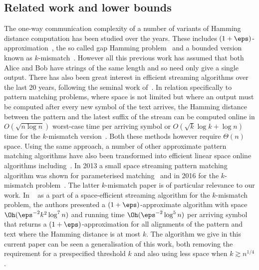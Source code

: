 \subsection{Related work and lower bounds}
The one-way communication complexity of a number of variants of Hamming distance computation has been studied over the years. These includes $(1+\eps)$-approximation~\cite{JW:2013}, the so called gap Hamming problem~\cite{CR:2012} and a bounded version known as $k$-mismatch~\cite{HSZZ:06}. However all this previous work has assumed that both Alice and Bob have strings of the same length and so need only give a single output. There has also been great interest in efficient streaming algorithms over the last 20 years, following the seminal work of~\cite{AMS:1996}. In relation specifically to pattern matching problems,  where space is not limited but where an output must be computed after every new symbol of the text arrives, the Hamming distance between the pattern and the latest suffix of the stream can be computed online in $O(\sqrt{n\log{n}})$ worst-case time per arriving symbol or $O(\sqrt{k}\log{k} + \log{n})$ time for the $k$-mismatch version~\cite{CS:2010}.  Both these methods however require $\Theta(n)$ space.  Using the same approach, a number of other approximate pattern matching algorithms have also been transformed into efficient linear space online algorithms including~\cite{AAKLP:2008,AABLLPSV:2009,AALP:2006,AFM:1994, AEE:2006,ACHP:2003,LV:1988kdiff}. In 2013 a small space streaming pattern matching algorithm was shown for parameterised matching~\cite{JPS:2013} and in 2016 for the $k$-mismatch problem~\cite{CFPSS:2016}. The latter $k$-mismatch paper is of particular relevance to our work. In ~\cite{CFPSS:2016} as a part of a space-efficient streaming algorithm for the $k$-mismatch problem, the authors presented a $(1+\eps)$-approximate algorithm with space $\Oh(\eps^{-2} k^2 \log^7 n)$ and running time $\Oh(\eps^{-2} \log^5 n)$ per arriving symbol that returns a $(1+\eps)$-approximation for all alignments of the pattern and text where the Hamming distance is at most $k$. The algorithm we give in this current paper can be seen a generalisation of this work, both removing the requirement for a prespecified threshold $k$ and also using less space when $k \gtrsim n^{1/4}$.
 
 
